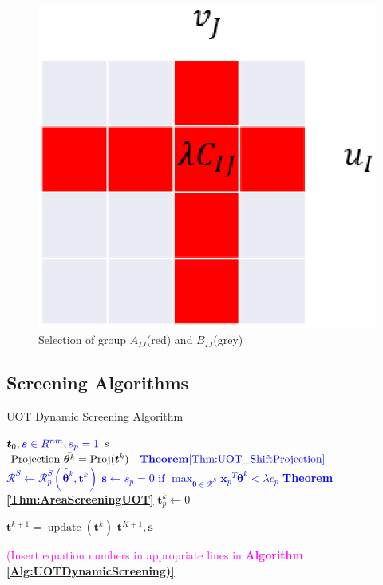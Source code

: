 \documentclass[twoside]{article}
\theoremstyle{plain}
\newcommand{\tranT}{T}
\renewcommand{\vec}[1]{\bm{#1}}
\newcommand{\changeXS}[1]{\textcolor{blue}{#1}}
\newcommand{\note}[1]{\textcolor{magenta}{#1}}
\begin{document}
	\begin{figure}[h]
	\begin{center}	
	\includegraphics[width = 0.7\linewidth]{pic/divide}
	\caption{Selection of group $A_{IJ}$(red) and $B_{IJ}$(grey)}
	\end{center}	
	\end{figure}

\subsection{Screening Algorithms}

 \begin{algorithm}
 \caption{UOT Dynamic Screening Algorithm}
 \begin{algorithmic}[h]
 \label{Alg:UOTDynamicScreening}
 \renewcommand{\algorithmicrequire}{\textbf{Input:}}
 \renewcommand{\algorithmicensure}{\textbf{Output:}}
 \REQUIRE $\vec{t}_0,  \changeXS{\vec s \in R^{nm}, s_{p}=1}$
 \ENSURE $s$
 \STATE {}
 \STATE $\text{Projection } \tilde{\vec{\theta}^{k}} = \operatorname{Proj}(\vec{t}^k) \changeXS{\quad \bf Theorem \ref{Thm:UOT_ShiftProjection}}$  
  \STATE  \changeXS{$\mathcal{R}^{S} \leftarrow \mathcal{R}_{p}^S{(\tilde{\vec{\theta}^{k}},\vec{t}^k)}$}
   \STATE  \changeXS{$\vec s \leftarrow {s_{p} = 0 \text{ if } \max_{\vec{\theta} \in \mathcal{R}^S} {\vec x_{p}}^{\tranT}\vec{\theta}^{k} <\lambda c_{p} }$ \bf Theorem \ref{Thm:AreaScreeningUOT}}
  \ENDFOR
 \FOR  { \changeXS{$p \in \{p\|s_{p}=0\}$}}
  \STATE $\vec{t}^k_p \leftarrow 0$
  
  \ENDFOR
  \STATE $\vec{t}^{k+1} = \operatorname{update}(\vec{t}^k)$
 \ENDFOR
   \RETURN $\vec{t}^{K+1}, \vec s $
 \end{algorithmic} 
 \end{algorithm}
 \note{(Insert equation numbers in appropriate lines in {\bf Algorithm \ref{Alg:UOTDynamicScreening)}}}
\end{document}
